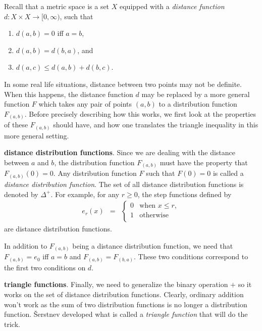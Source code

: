 \documentclass[12pt]{article}
\begin{document}
Recall that a metric space is a set $X$ equipped with a \emph{distance function} $d:X\times X\to [0,\infty)$, such that 
\begin{enumerate}
\item $d(a,b)=0$ iff $a=b$,
\item $d(a,b)=d(b,a)$, and
\item $d(a,c)\le d(a,b)+d(b,c)$.
\end{enumerate}
In some real life situations, distance between two points may not be definite.  When this happens, the distance function $d$ may be replaced by a more general function $F$ which takes any pair of points $(a,b)$ to a distribution function $F_{(a,b)}$.  Before precisely describing how this works, we first look at the properties of these $F_{(a,b)}$ should have, and how one translates the triangle inequality in this more general setting.

\textbf{distance distribution functions}.  Since we are dealing with the distance between $a$ and $b$, the distribution function $F_{(a,b)}$ must have the property that $F_{(a,b)}(0)=0$.  Any distribution function $F$ such that $F(0)=0$ is called a \emph{distance distribution function}.  The set of all distance distribution functions is denoted by $\Delta^+$.  For example, for any $r\ge 0$, the step functions defined by 
\begin{eqnarray*}
e_r(x) &=& \left\{ \begin {array}{ll}
0 & \mbox{when}\,\, x\le r, \\
1 & \mbox{otherwise} \\ \end{array} \right.
\end{eqnarray*}
are distance distribution functions.

In addition to $F_{(a,b)}$ being a distance distribution function, we need that $F_{(a,b)}=e_0$ iff $a=b$ and $F_{(a,b)}=F_{(b,a)}$.  These two conditions correspond to the first two conditions on $d$.

\textbf{triangle functions}.  Finally, we need to generalize the binary operation $+$ so it works on the set of distance distribution functions.  Clearly, ordinary addition won't work as the sum of two distribution functions is no longer a distribution function.  \v{S}erstnev developed what is called a \emph{triangle function} that will do the trick.  
\end{document}
